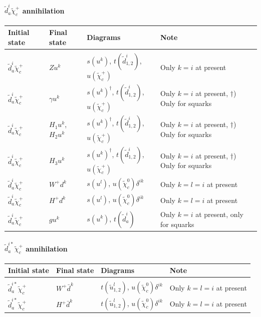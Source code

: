 \documentclass[a4paper,10pt,oneside]{book}
\newcommand{\tabspace}{\\[-2.5ex]}
\begin{document}
\paragraph{$\tilde{d}^{i}_{a} \tilde{\chi}_{c}^{+}$ annihilation}

\begin{center}
\begin{tabular}{llll} \hline
{\bfseries Initial state} & {\bfseries Final state} &
{\bfseries Diagrams} & {\bfseries Note} \\ \hline \tabspace
$\tilde{d}^{i}_a \tilde{\chi}_{c}^+$ & $Z u^k$ &
$s(u^k)$, $t(\tilde{d}^i_{1,2})$, $u(\tilde{\chi}_c^+)$
& Only $k=i$ at present \\
$\tilde{d}^{i}_a \tilde{\chi}_{c}^+$ & $\gamma u^k$ &
$s(u^k)^\dagger$, $t(\tilde{d}^i_{1,2})$, $u(\tilde{\chi}_c^+)$ 
& Only $k=i$ at present, $\dagger$) Only for squarks \\
$\tilde{d}^{i}_a \tilde{\chi}_{c}^+$ & $H_1 u^k$, $H_2 u^k$ &
$s(u^k)^\dagger$, $t(\tilde{d}^i_{1,2})$, $u(\tilde{\chi}_c^+)$ 
& Only $k=i$ at present, $\dagger$) Only for squarks \\
$\tilde{d}^{i}_a \tilde{\chi}_{c}^+$ & $H_3 u^k$ &
$s(u^k)^\dagger$, $t(\tilde{d}^i_{1,2})$, $u(\tilde{\chi}_c^+)$ 
& Only $k=i$ at present, $\dagger$) Only for squarks \\
$\tilde{d}^{i}_a \tilde{\chi}_{c}^+$ & $W^+ d^k$ &
$s(u^l)$, $u(\tilde{\chi}_c^0)\delta^{ik}$
& Only $k=l=i$ at present \\
$\tilde{d}^{i}_a \tilde{\chi}_{c}^+$ & $H^+ d^k$ &
$s(u^l)$, $u(\tilde{\chi}_c^0)\delta^{ik}$
& Only $k=l=i$ at present \\
$\tilde{d}^{i}_a \tilde{\chi}_{c}^+$ & $g u^k$ &
$s(u^k)$, $t(\tilde{d}_a^i)$
& Only $k=i$ at present, only for squarks \\ \hline
\end{tabular}
\end{center}

\paragraph{$\tilde{d}^{i*}_{a} \tilde{\chi}_{c}^{+}$ annihilation}

\begin{center}
\begin{tabular}{llll} \hline
{\bfseries Initial state} & {\bfseries Final state} &
{\bfseries Diagrams} & {\bfseries Note} \\ \hline \tabspace
$\tilde{d}^{i*}_a \tilde{\chi}_{c}^+$ & $W^+ \bar{d}^k$ &
$t(\tilde{u}^l_{1,2})$, $u(\tilde{\chi}_c^0)\delta^{ik}$ 
& Only $k=l=i$ at present \\
$\tilde{d}^{i*}_a \tilde{\chi}_{c}^+$ & $H^+ \bar{d}^k$ &
$t(\tilde{u}^l_{1,2})$, $u(\tilde{\chi}_c^0)\delta^{ik}$
& Only $k=l=i$ at present \\ \hline
\end{tabular}
\end{center}
\end{document}
